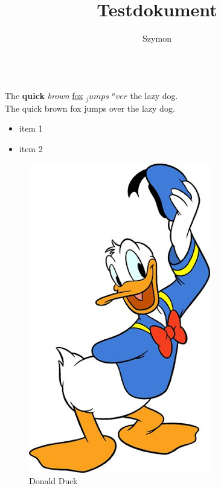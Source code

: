 \documentclass[12pt, twocolumn]{article}
\author{Szymon}
\title{Testdokument}
\begin{document}
\maketitle
\blindtext
\\
The \textbf{quick} \textit{brown} \underline{fox} $_jumps$ $^over$ the lazy dog. 
\\
{\tiny The} {\scriptsize quick} {\normalsize brown} {\large fox} {\LARGE jumps} {\huge over} the lazy dog.
\\
\begin{itemize}
	\item item 1
	\item item 2
\end{itemize}
\blindtext
\begin{figure}
	\includegraphics{Donald.png}
	\caption{Donald Duck}
	\label{fig:donald}
\end{figure}
\blindtext
\end{document}
